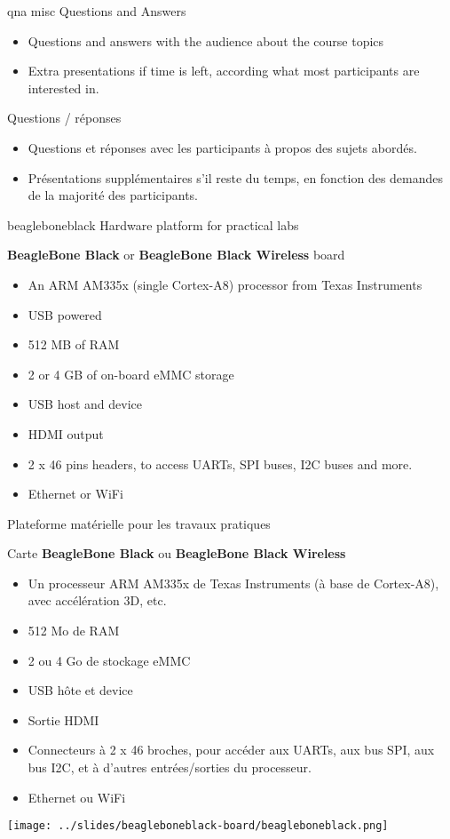 {qna}
{misc}
{Questions and Answers}
{
  \begin{itemize}
  \item Questions and answers with the audience about the course topics
  \item Extra presentations if time is left, according what most
        participants are interested in.
  \end{itemize}
}
{Questions / réponses}
{
  \begin{itemize}
  \item Questions et réponses avec les participants à propos des sujets abordés.
  \item Présentations supplémentaires s'il reste du temps, en fonction des demandes
        de la majorité des participants.
  \end{itemize}
}


{beagleboneblack}
{Hardware platform for practical labs}
{
  {\bf BeagleBone Black} or {\bf BeagleBone Black Wireless} board
  \begin{itemize}
  \item An ARM AM335x (single Cortex-A8) processor from Texas
    Instruments
  \item USB powered
  \item 512 MB of RAM
  \item 2 or 4 GB of on-board eMMC storage
  \item USB host and device
  \item HDMI output
  \item 2 x 46 pins headers, to access UARTs, SPI buses, I2C buses
    and more.
  \item Ethernet or WiFi
  \end{itemize}
}
{Plateforme matérielle pour les travaux pratiques}
{
  Carte {\bf BeagleBone Black} ou {\bf BeagleBone Black Wireless}
  \begin{itemize}
  \item Un processeur ARM AM335x de Texas Instruments (à base de
    Cortex-A8), avec accélération 3D, etc.
  \item 512 Mo de RAM
  \item 2 ou 4 Go de stockage eMMC
  \item USB hôte et device
  \item Sortie HDMI
  \item Connecteurs à 2 x 46 broches, pour accéder aux UARTs, aux bus
    SPI, aux bus I2C, et à d'autres entrées/sorties du processeur.
  \item Ethernet ou WiFi
  \end{itemize}
}
{
  \begin{center}
    \texttt{[image: ../slides/beagleboneblack-board/beagleboneblack.png]}
  \end{center}
}

